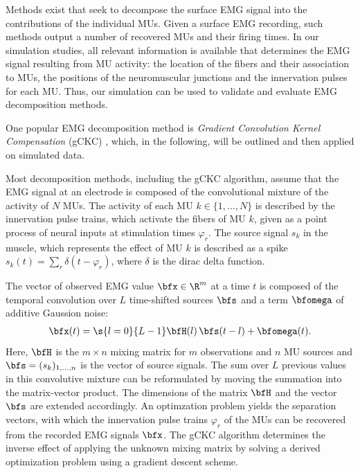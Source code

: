 Methods exist that seek to decompose the surface EMG signal into the contributions of the individual MUs. Given a surface EMG recording, such methods output a number of recovered MUs and their firing times.
In our simulation studies, all relevant information is available that determines the EMG signal resulting from MU activity: the location of the fibers and their association to MUs, the positions of the neuromuscular junctions and the innervation pulses for each MU.
Thus, our simulation can be used to validate and evaluate EMG decomposition methods.

One popular EMG decomposition method is \emph{Gradient Convolution Kernel Compensation} (gCKC) \cite{Holobar2007b,Holobar2007}, which, in the following, will be outlined and then applied on simulated data.

Most decomposition methods, including the gCKC algorithm, assume that the EMG signal at an electrode is composed of the convolutional mixture of the activity of $N$ MUs.
The activity of each MU $k\in \{1,\dots,N\}$ is described by the innervation pulse trains, which activate the fibers of MU $k$, given as a point process of neural inputs at stimulation times $\varphi_r$. The source signal $s_k$ in the muscle, which represents the effect of MU $k$ is described as a spike $s_k(t) = \sum_r\delta(t - \varphi_r)$, where $\delta$ is the dirac delta function.

The vector of observed EMG value $\bfx \in \R^m$ at a time $t$ is composed of the temporal convolution over $L$ time-shifted sources $\bfs$ and a term $\bfomega$ of additive Gaussion noise:
\begin{align*}
  \bfx(t) = \s{l=0}{L-1}\bfH(l)\,\bfs(t-l) + \bfomega(t).
\end{align*}
Here, $\bfH$ is the $m\times n$ mixing matrix for $m$ observations and $n$ MU sources and $\bfs = (s_k)_{1,\dots,n}$ is the vector of source signals. The sum over $L$ previous values in this convolutive mixture can be reformulated by moving the summation into the matrix-vector product. The dimensions of the matrix $\bfH$ and the vector $\bfs$ are extended accordingly. 
An optimzation problem yields the separation vectors, with which the innervation pulse trains $\varphi_r$ of the MUs can be recovered from the recorded EMG signals $\bfx$. The gCKC algorithm determines the inverse effect of applying the unknown mixing matrix by solving a derived optimization problem using a gradient descent scheme.


